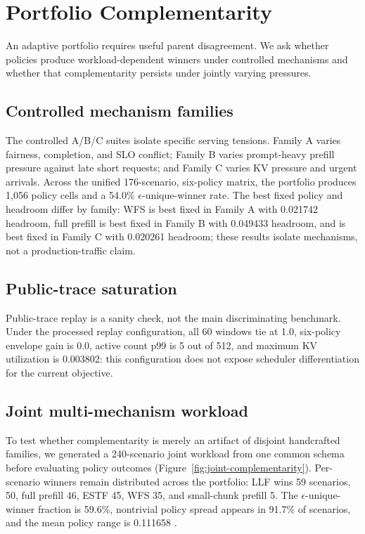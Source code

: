 \documentclass[runningheads]{llncs}
\begin{document}
\section{Portfolio Complementarity}
\label{sec:complementarity}

An adaptive portfolio requires useful parent disagreement. We ask whether
policies produce workload-dependent winners under controlled mechanisms and
whether that complementarity persists under jointly varying pressures.

\subsection{Controlled mechanism families}

The controlled A/B/C suites isolate specific serving tensions. Family A varies
fairness, completion, and SLO conflict; Family B varies prompt-heavy prefill
pressure against late short requests; and Family C varies KV pressure and
urgent arrivals. Across the unified 176-scenario, six-policy matrix, the
portfolio produces 1,056 policy cells and a 54.0\% $\epsilon$-unique-winner
rate. The best fixed policy and \vbs{} headroom differ by family: WFS is best
fixed in Family A with 0.021742 headroom, full prefill is best fixed in Family
B with 0.049433 headroom, and  is best fixed in
Family C with 0.020261 headroom; these results isolate mechanisms, not a
production-traffic claim.

\subsection{Public-trace saturation}

Public-trace replay is a sanity check, not the main discriminating benchmark.
Under the processed replay configuration, all 60 windows tie at \anwg{} 1.0,
six-policy envelope gain is 0.0, active count p99 is 5 out of 512, and maximum
KV utilization is 0.003802: this configuration does not expose scheduler
differentiation for the current objective.

\subsection{Joint multi-mechanism workload}

To test whether complementarity is merely an artifact of disjoint handcrafted
families, we generated a 240-scenario joint workload from one common schema
before evaluating policy outcomes (Figure~\ref{fig:joint-complementarity}).
Per-scenario winners remain distributed across the portfolio: LLF wins 59
scenarios,  50, full prefill 46, ESTF 45, WFS
35, and small-chunk prefill 5. The $\epsilon$-unique-winner fraction is
59.6\%, nontrivial policy spread appears in 91.7\% of scenarios, and the mean
policy range is 0.111658 \anwg{}.
\end{document}
